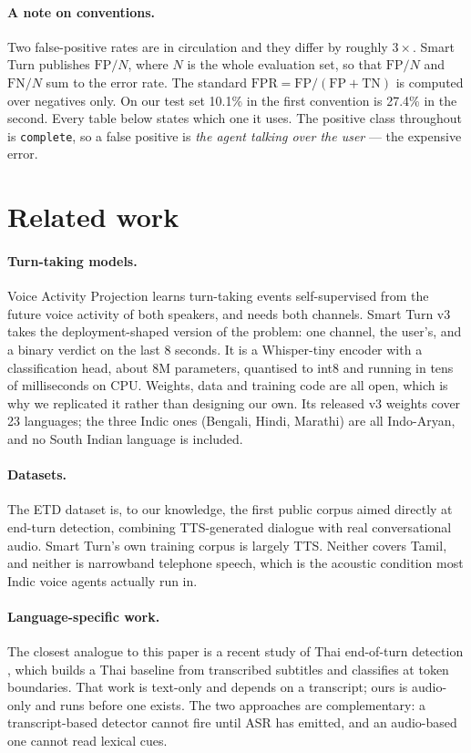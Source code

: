 \documentclass[11pt]{article}
\newcommand{\pct}{\%}
\begin{document}
\paragraph{A note on conventions.}
Two false-positive rates are in circulation and they differ by roughly
$3\times$. Smart Turn publishes $\mathrm{FP}/N$, where $N$ is the whole
evaluation set, so that $\mathrm{FP}/N$ and $\mathrm{FN}/N$ sum to the error
rate. The standard $\mathrm{FPR}=\mathrm{FP}/(\mathrm{FP}+\mathrm{TN})$ is
computed over negatives only. On our test set 10.1\pct{} in the first convention
is 27.4\pct{} in the second. Every table below states which one it uses. The
positive class throughout is \texttt{complete}, so a false positive is
\emph{the agent talking over the user} --- the expensive error.

\section{Related work}

\paragraph{Turn-taking models.} Voice Activity Projection
\cite{vap} learns turn-taking events self-supervised from the future voice
activity of both speakers, and needs both channels. Smart Turn v3
\cite{smartturn} takes the deployment-shaped version of the problem: one
channel, the user's, and a binary verdict on the last 8 seconds. It is a
Whisper-tiny encoder \cite{whisper} with a classification head, about 8M
parameters, quantised to int8 and running in tens of milliseconds on CPU. Weights,
data and training code are all open, which is why we replicated it rather than
designing our own. Its released v3 weights cover 23 languages; the three Indic ones
(Bengali, Hindi, Marathi) are all Indo-Aryan, and no South Indian language is
included.

\paragraph{Datasets.} The ETD dataset \cite{etd} is, to our knowledge, the first
public corpus aimed directly at end-turn detection, combining TTS-generated
dialogue with real conversational audio. Smart Turn's own training corpus is largely TTS. Neither
covers Tamil, and neither is narrowband telephone speech, which is the acoustic
condition most Indic voice agents actually run in.

\paragraph{Language-specific work.} The closest analogue to this paper is a
recent study of Thai end-of-turn detection \cite{thaieot}, which builds a Thai
baseline from transcribed subtitles and classifies at token boundaries. That
work is text-only and depends on a transcript; ours is audio-only and runs
before one exists. The two approaches are complementary: a transcript-based
detector cannot fire until ASR has emitted, and an audio-based one cannot read
lexical cues.
\end{document}
